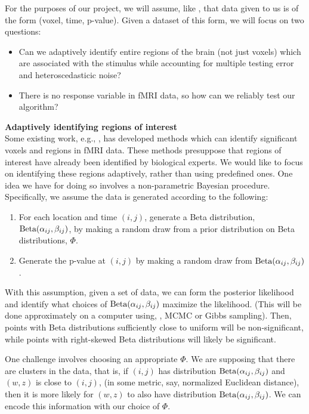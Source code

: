 \documentclass[12pt]{article}
\begin{document}
For the purposes of our project, we will assume, like \cite{foygel2015p}, that data given to us is of the form (voxel, time, p-value). Given 
a dataset of this form, we will focus on two questions: 
\begin{itemize}
\item Can we adaptively identify entire regions of the brain (not just voxels) which are associated with the stimulus while
accounting for multiple testing error and heteroscedasticic noise?
\item There is no response variable in fMRI data, so how can we reliably test our algorithm? 
\end{itemize}
\vspace{1em}
{\bf Adaptively identifying regions of interest}  \\
Some existing work, e.g.,  \cite{foygel2015p},  has developed methods which can identify significant voxels and regions in fMRI data.  
These methods presuppose that regions of interest have already been identified by biological experts. We would like to focus on 
identifying these regions adaptively, rather than using predefined ones. One idea we have for doing so involves 
a non-parametric Bayesian procedure.  Specifically, we assume the data is generated according to the following:  
\begin{enumerate}
\item  For each location and time $(i,j)$,  generate a Beta distribution, $\mbox{Beta}(\alpha_{ij}, \beta_{ij})$, by making a random draw 
from a prior distribution on Beta distributions, $\Phi$.
\item  Generate the p-value at $(i,j)$ by making a random draw from $\mbox{Beta}(\alpha_{ij}, \beta_{ij})$. 
\end{enumerate}
With this assumption, given a set of data, we can form the posterior likelihood and identify what choices of 
 $\mbox{Beta}(\alpha_{ij}, \beta_{ij})$ maximize the likelihood. (This will be done approximately on a computer using, \eg, MCMC or Gibbs sampling). Then, points with Beta distributions sufficiently close to uniform will be non-significant, while points with right-skewed Beta distributions will likely be significant.  

One challenge involves choosing an appropriate $\Phi$. We are supposing that there are clusters in the data, that is, if $(i,j)$ has distribution $\mbox{Beta}(\alpha_{ij}, \beta_{ij})$ and $(w,z)$ is close to $(i,j)$, (in some metric, say, normalized Euclidean distance), then it is more likely for 
$(w,z)$ to also have distribution $\mbox{Beta}(\alpha_{ij}, \beta_{ij})$. We can encode this information with our choice of $\Phi$. 
\end{document}
